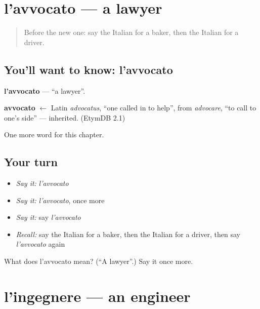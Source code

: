 \section[l'avvocato]{l'avvocato — a lawyer}

\label{lesson:IT-C112-avvocato}



\begin{quote}
Before the new one: say the Italian for a baker, then the Italian for a driver.
\end{quote}

\subsection*{You'll want to know: l'avvocato}
\textbf{l'avvocato} — \textquotedblleft{}a lawyer\textquotedblright{}.

\begin{cousinweb}
\textbf{avvocato} $\leftarrow$ Latin \emph{advocatus}, \textquotedblleft{}one called in to help\textquotedblright{}, from \emph{advocare}, \textquotedblleft{}to call to one's side\textquotedblright{} — inherited. (EtymDB 2.1)
\end{cousinweb}

\begin{grammarlens}[title={What you've built}]
One more word for this chapter.
\end{grammarlens}

\subsection*{Your turn}
\begin{itemize}
\raggedright
  \item \emph{Say it:} \emph{l'avvocato}
  \item \emph{Say it:} \emph{l'avvocato}, once more
  \item \emph{Say it:} say \emph{l'avvocato}
  \item \emph{Recall:} say the Italian for a baker, then the Italian for a driver, then say \emph{l'avvocato} again
\end{itemize}

\begin{tcolorbox}[breakable,colback=teal!4,colframe=teal!35!black,title={Before you move on}]
What does l'avvocato mean? (\textquotedblleft{}A lawyer\textquotedblright{}.) Say it once more.
\end{tcolorbox}
\section[l'ingegnere]{l'ingegnere — an engineer}

